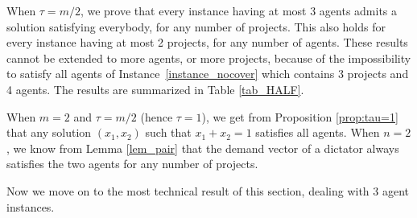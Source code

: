 \documentclass{article}
\begin{document}
When $\tau=m/2$, we prove that every instance having at most 3 agents admits a 
solution satisfying everybody, for any number of projects. This also holds for every instance having at most 2 projects, for any number of agents. These results cannot be extended to more agents, or more projects, because of the impossibility to satisfy all agents of Instance~\ref{instance_nocover} which contains 3 projects and 4 agents. The results are summarized in Table \ref{tab_HALF}.


\begin{comment}
\begin{proposition} \label{allagentsm=2} When $m = 2$ and $\tau=1$, any solution $(x_1,x_2)$ such that $x_1+x_2=1$ satisfies any agent.%
\end{proposition}
\begin{proof}
By contradiction, suppose some agent $i$ is unsatisfied:   $\dell^i_1>x_1$ and $\dell^i_2>x_2$ hold so we get that 
$\dell^i_1+\dell^i_2>x_1+x_2=1$, contradicting (\ref{mass_l}).  %
\end{proof}
\end{comment}

When $m=2$ and $\tau=m/2$ (hence $\tau=1$),  we get from Proposition \ref{prop:tau=1} that any solution $(x_1,x_2)$ such that $x_1+x_2=1$ satisfies all agents. 
When $n=2$, we know from Lemma \ref{lem_pair} that the demand vector of a dictator always satisfies the two agents for any number of projects. 

Now we move on to the %
most technical result of this section, dealing with 3 agent instances.


\end{document}
